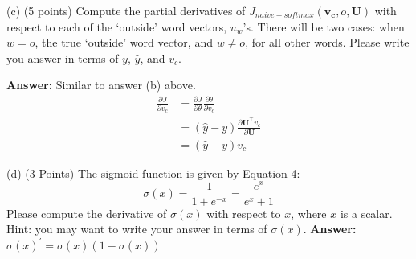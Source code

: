 \documentclass{article}
\begin{document}
\bigbreak

\noindent(c)  (5 points) Compute the partial derivatives of $J_{naive-softmax}(\mathbf{v_c},o,\mathbf{U})$ with respect to each of the ‘outside’ word vectors, $u_w$’s.  There will be two cases:  when $w=o$, the true ‘outside’ word vector, and $w\ne{o}$, for all other words.  Please write you answer in terms of $y$, $\hat{y}$, and $v_c$.
\bigbreak

\textbf{Answer:} Similar to answer (b) above.
\begin{align*}
    \frac{\partial J}{\partial v_c} &= \frac{\partial J}{\partial \theta} \frac{\partial \theta}{\partial v_c}\\
    &= (\hat{y} - y) \frac{\partial \mathbf{U^\intercal}v_c}{\partial \mathbf{U}} \\
    &= (\hat{y} - y) v_c
\end{align*}
\bigbreak


\noindent(d)  (3 Points) The sigmoid function is given by Equation 4:
\begin{equation} \label{eq4}
\sigma(x) = \frac{1}{1+e^{-x}} =  \frac{e^{x}}{e^{x} + 1}
\end{equation}
Please compute the derivative of $\sigma(x)$ with respect to $x$, where $x$ is a scalar.  Hint:  you may want to write your answer in terms of $\sigma(x)$.
\bigbreak
\textbf{Answer:} $\sigma(x)^{\prime} = \sigma(x) (1 - \sigma(x))$
\bigbreak
\end{document}
